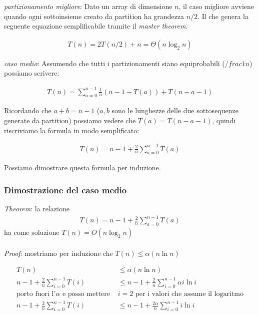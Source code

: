 \documentclass{article}
\begin{document}
\emph{partizionamento migliore}:
Dato un array di dimensione $n$, il caso migliore avviene quando ogni
sottoinsieme creato da partition ha grandezza $n/2$. Il che genera la seguente
equazione semplificabile tramite il \emph{master theorem}.

\begin{align*}
  T(n) = 2T(n/2)+n = \Theta(n \log_2 n)
\end{align*}

\emph{caso medio}:
Assumendo che tutti i partizionamenti siano equiprobabili ($/frac{1}{n}$)
possiamo scrivere:

\begin{align*}
  T(n) = \sum_{a=0}^{n-1} \frac{1}{n} (n-1-T(a)) + T(n-a-1)
\end{align*}

Ricordando che $a+b=n-1$ ($a, b$ sono le lunghezze delle due sottosequenze
generate da partition) possiamo vedere che $T(a) = T(n-a-1)$, quindi riscriviamo
la formula in modo semplificato:

\begin{align*}
  T(n) = n - 1 + \frac{2}{n} \sum_{a=0}^{n-1} T(a)
\end{align*}

Possiamo dimostrare questa formula per induzione.

\subsubsection{Dimostrazione del caso medio}

\emph{Theorem}: la relazione
\begin{align*}
  T(n) = n - 1 + \frac{2}{n} \sum_{a=0}^{n-1} T(a)
\end{align*}
ha come soluzione $T(n) = O(n \log_2 n)$ \\ \\
\emph{Proof}: mostriamo per induzione che $T(n) \leq \alpha (n \ln n)$

\begin{align*}
  T(n) &\leq \alpha (n \ln n) \\
  n - 1 + \frac{2}{n} \sum_{i = 0}^{n-1} T(i) &\leq n - 1 + \frac{2}{n} \sum_{i = 0}^{n-1} \alpha i \ln i \\
  \text{porto } \text{fuori l'}\alpha \text{ e posso mettere }& i=2 \text{ per i valori che assume il logaritmo} \\
  n - 1 + \frac{2}{n} \sum_{i = 0}^{n-1} T(i) &\leq n - 1 + \frac{2 \alpha}{n} \sum_{i = 0}^{n-1} i \ln i
\end{align*}
\end{document}
